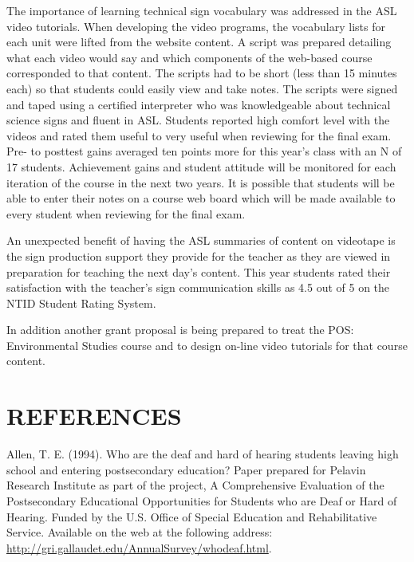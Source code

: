 \documentclass[11.5pt]{sig-alternate} %
\begin{document}
\begin{large}
The importance of learning technical sign vocabulary was addressed in the ASL video tutorials.  When developing the video programs, the vocabulary lists for each unit were lifted from the website content. A script was prepared detailing what each video would say and which components of the web-based course corresponded to that content.  The scripts had to be short (less than 15 minutes each) so that students could easily view and take notes.  The scripts were signed and taped using a certified interpreter who was knowledgeable about technical science signs and fluent in ASL.  Students reported high comfort level with the videos and rated them useful to very useful when reviewing for the final exam.  Pre- to posttest gains averaged ten points more for this year’s class with an N of 17 students.  Achievement gains and student attitude will be monitored for each iteration of the course in the next two years.  It is possible that students will be able to enter their notes on a course web board which will be made available to every student when reviewing for the final exam. 
 
An unexpected benefit of having the ASL summaries of content on videotape is the sign production support they provide for the teacher as they are viewed in preparation for teaching the next day’s content.  This year students rated their satisfaction with the teacher’s sign communication skills as 4.5 out of 5 on the NTID Student Rating System. 
 
In addition another grant proposal is being prepared to treat the POS:  Environmental Studies course and to design on-line video tutorials for that course content. 

\end{large}
 
\section*{REFERENCES}\par 

\leftskip 0.25in
\parindent -0.25in 
Allen, T. E.  (1994). Who are the deaf and hard of hearing students leaving high school and entering postsecondary education?  Paper prepared for Pelavin Research Institute as part of the project, A Comprehensive Evaluation of the Postsecondary Educational Opportunities for Students who are Deaf or Hard of Hearing.  Funded by the U.S. Office of Special Education and Rehabilitative Service.  Available on the web at the following address:  \url{http://gri.gallaudet.edu/AnnualSurvey/whodeaf.html}. 
 
\end{document}
